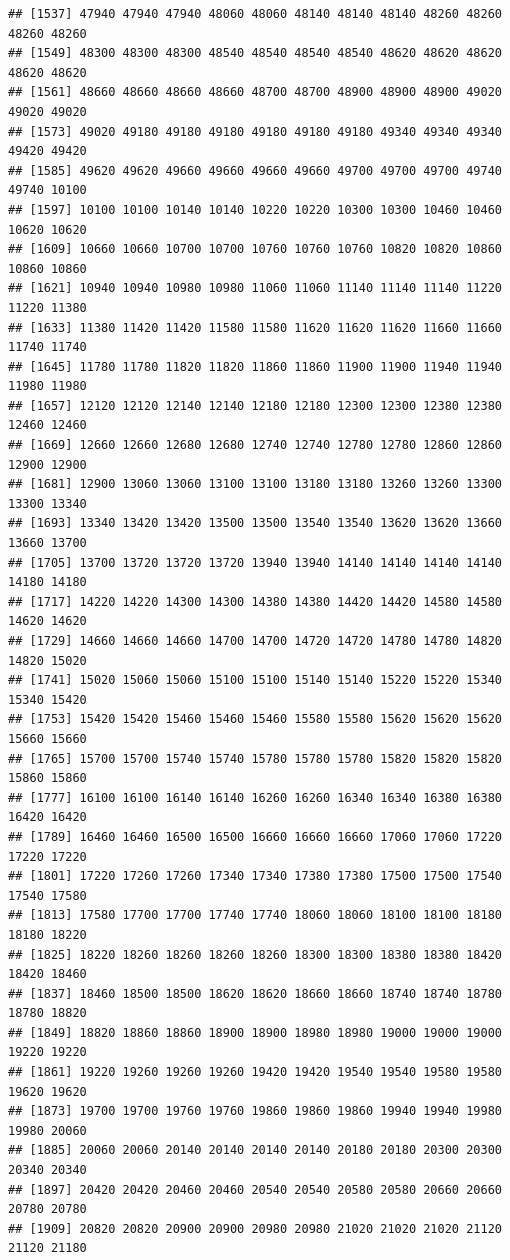 \documentclass[
  12pt,
]{article}
\begin{document}
\begin{verbatim}
## [1537] 47940 47940 47940 48060 48060 48140 48140 48140 48260 48260 48260 48260
## [1549] 48300 48300 48300 48540 48540 48540 48540 48620 48620 48620 48620 48620
## [1561] 48660 48660 48660 48660 48700 48700 48900 48900 48900 49020 49020 49020
## [1573] 49020 49180 49180 49180 49180 49180 49180 49340 49340 49340 49420 49420
## [1585] 49620 49620 49660 49660 49660 49660 49700 49700 49700 49740 49740 10100
## [1597] 10100 10100 10140 10140 10220 10220 10300 10300 10460 10460 10620 10620
## [1609] 10660 10660 10700 10700 10760 10760 10760 10820 10820 10860 10860 10860
## [1621] 10940 10940 10980 10980 11060 11060 11140 11140 11140 11220 11220 11380
## [1633] 11380 11420 11420 11580 11580 11620 11620 11620 11660 11660 11740 11740
## [1645] 11780 11780 11820 11820 11860 11860 11900 11900 11940 11940 11980 11980
## [1657] 12120 12120 12140 12140 12180 12180 12300 12300 12380 12380 12460 12460
## [1669] 12660 12660 12680 12680 12740 12740 12780 12780 12860 12860 12900 12900
## [1681] 12900 13060 13060 13100 13100 13180 13180 13260 13260 13300 13300 13340
## [1693] 13340 13420 13420 13500 13500 13540 13540 13620 13620 13660 13660 13700
## [1705] 13700 13720 13720 13720 13940 13940 14140 14140 14140 14140 14180 14180
## [1717] 14220 14220 14300 14300 14380 14380 14420 14420 14580 14580 14620 14620
## [1729] 14660 14660 14660 14700 14700 14720 14720 14780 14780 14820 14820 15020
## [1741] 15020 15060 15060 15100 15100 15140 15140 15220 15220 15340 15340 15420
## [1753] 15420 15420 15460 15460 15460 15580 15580 15620 15620 15620 15660 15660
## [1765] 15700 15700 15740 15740 15780 15780 15780 15820 15820 15820 15860 15860
## [1777] 16100 16100 16140 16140 16260 16260 16340 16340 16380 16380 16420 16420
## [1789] 16460 16460 16500 16500 16660 16660 16660 17060 17060 17220 17220 17220
## [1801] 17220 17260 17260 17340 17340 17380 17380 17500 17500 17540 17540 17580
## [1813] 17580 17700 17700 17740 17740 18060 18060 18100 18100 18180 18180 18220
## [1825] 18220 18260 18260 18260 18260 18300 18300 18380 18380 18420 18420 18460
## [1837] 18460 18500 18500 18620 18620 18660 18660 18740 18740 18780 18780 18820
## [1849] 18820 18860 18860 18900 18900 18980 18980 19000 19000 19000 19220 19220
## [1861] 19220 19260 19260 19260 19420 19420 19540 19540 19580 19580 19620 19620
## [1873] 19700 19700 19760 19760 19860 19860 19860 19940 19940 19980 19980 20060
## [1885] 20060 20060 20140 20140 20140 20140 20180 20180 20300 20300 20340 20340
## [1897] 20420 20420 20460 20460 20540 20540 20580 20580 20660 20660 20780 20780
## [1909] 20820 20820 20900 20900 20980 20980 21020 21020 21020 21120 21120 21180

\end{verbatim}
\end{document}
